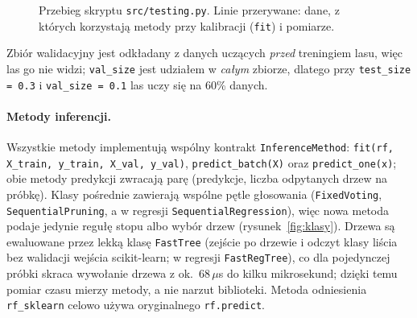 \documentclass{article}
\newcommand{\code}[1]{\texttt{#1}}
\begin{document}
\begin{figure}[H]
\caption{Przebieg skryptu \code{src/testing.py}. Linie przerywane: dane, z których
korzystają metody przy kalibracji (\code{fit}) i pomiarze.}
\label{fig:benchmark}
\end{figure}

Zbiór walidacyjny jest odkładany z danych uczących \emph{przed} treningiem lasu, więc
las go nie widzi; \code{val\_size} jest udziałem w \emph{całym} zbiorze, dlatego przy
\code{test\_size = 0.3} i \code{val\_size = 0.1} las uczy się na 60\% danych.

\paragraph{Metody inferencji.}
Wszystkie metody implementują wspólny kontrakt \code{InferenceMethod}:
\code{fit(rf, X\_train, y\_train, X\_val, y\_val)}, \code{predict\_batch(X)} oraz
\code{predict\_one(x)}; obie metody predykcji zwracają parę (predykcje, liczba
odpytanych drzew na próbkę). Klasy pośrednie zawierają wspólne pętle głosowania
(\code{FixedVoting}, \code{SequentialPruning}, a w regresji \code{SequentialRegression}),
więc nowa metoda podaje jedynie regułę stopu albo wybór drzew (rysunek~\ref{fig:klasy}).
Drzewa są ewaluowane przez lekką klasę \code{FastTree} (zejście po drzewie i odczyt klasy
liścia bez walidacji wejścia scikit-learn; w regresji \code{FastRegTree}), co dla
pojedynczej próbki skraca wywołanie drzewa z ok.\ 68\,$\mu$s do kilku mikrosekund; dzięki
temu pomiar czasu mierzy metody, a nie narzut biblioteki. Metoda odniesienia
\code{rf\_sklearn} celowo używa oryginalnego \code{rf.predict}.
\end{document}
